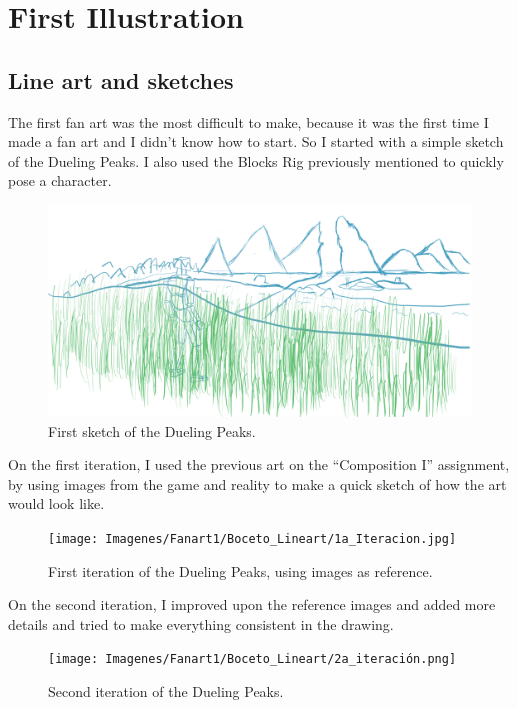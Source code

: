 \documentclass{cup-pan}
\begin{document}

\newpage
\section{First Illustration}
    \subsection{Line art and sketches}

        The first fan art was the most difficult to make, because it was the first time I made a fan art and I didn't know how to start. So I started with a simple sketch of the Dueling Peaks. 
        I also used the Blocks Rig previously mentioned to quickly pose a character.\\
        \begin{figure}[H]
            \includegraphics[width=\textwidth]{Imagenes/Fanart1/Boceto_Lineart/0 Imagen de partida.png}
            \caption{First sketch of the Dueling Peaks.}
        \end{figure}

        On the first iteration, I used the previous art on the “Composition I” assignment, by using images from the game and reality to make a quick sketch of how the art would look like.\\
        \begin{figure}[H]
            \texttt{[image: Imagenes/Fanart1/Boceto\_Lineart/1a\_Iteracion.jpg]}
            \caption{First iteration of the Dueling Peaks, using images as reference.}
        \end{figure}

        On the second iteration, I improved upon the reference images and added more details and tried to make everything consistent in the drawing.\\
        \begin{figure}[H]
            \texttt{[image: Imagenes/Fanart1/Boceto\_Lineart/2a\_iteración.png]}
            \caption{Second iteration of the Dueling Peaks.}
        \end{figure}
\end{document}
